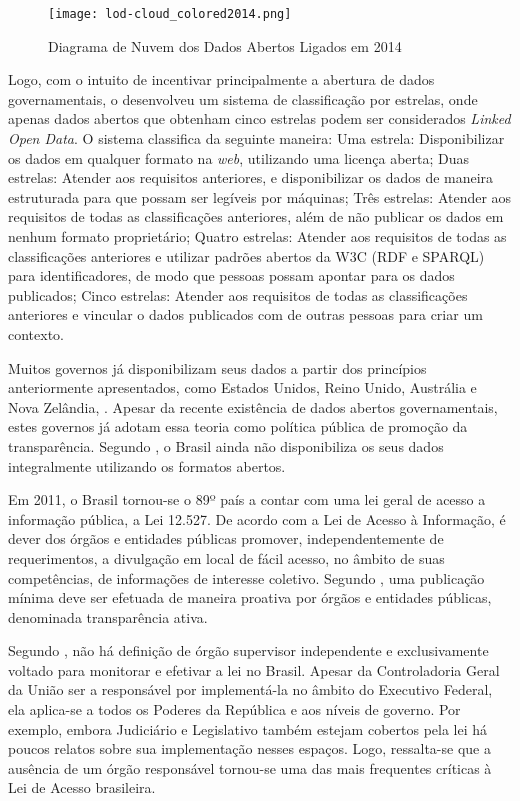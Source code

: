 \documentclass[
	12pt,				%
	openright,			%
	twoside,			%
	a4paper,			%
	english,			%
	french,				%
	spanish,			%
	brazil				%
	]{abntex2}
\begin{document}
\begin{figure}[htb]
	\caption{\label{grafo_lod}Diagrama de Nuvem dos Dados Abertos Ligados em 2014}
	\begin{center}
	    \texttt{[image: lod-cloud\_colored2014.png]}
	\end{center}
\end{figure}

Logo, com o intuito de incentivar principalmente a abertura de dados governamentais, o  
desenvolveu um sistema de classificação por estrelas, onde apenas dados abertos que obtenham cinco estrelas podem ser 
considerados \emph{Linked Open Data}. O sistema classifica da seguinte maneira:
Uma estrela: Disponibilizar os dados em qualquer formato na \emph{web}, utilizando uma licença aberta;
Duas estrelas: Atender aos requisitos anteriores, e disponibilizar os dados de maneira estruturada para que possam ser legíveis 
por máquinas;
Três estrelas: Atender aos requisitos de todas as classificações anteriores, além de não publicar os dados em nenhum formato 
proprietário;
Quatro estrelas: Atender aos requisitos de todas as classificações anteriores e utilizar padrões abertos da W3C (RDF e SPARQL)
para identificadores, de modo que pessoas possam apontar para os dados publicados;
Cinco estrelas: Atender aos requisitos de todas as classificações anteriores e vincular o dados publicados com de outras 
pessoas para criar um contexto.

Muitos governos já disponibilizam seus dados a partir dos princípios anteriormente apresentados, como Estados Unidos,
Reino Unido, Austrália e Nova Zelândia, \cite{agunegreg}. Apesar da recente existência de dados abertos governamentais,
estes governos já adotam essa teoria como política pública de promoção da transparência. Segundo , o Brasil ainda não disponibiliza os
seus dados integralmente utilizando os formatos abertos.

Em 2011, o Brasil tornou-se o 89º país a contar com uma lei geral de acesso a informação pública, a Lei 12.527. De acordo com 
a Lei de Acesso à Informação, é dever dos órgãos e entidades públicas promover, independentemente de requerimentos, a divulgação
em local de fácil acesso, no âmbito de suas competências, de informações de interesse coletivo. Segundo , uma publicação mínima deve ser
efetuada de maneira proativa por órgãos e entidades públicas, denominada transparência ativa.

Segundo , não há definição de órgão supervisor independente e exclusivamente voltado para monitorar
e efetivar a lei no Brasil. Apesar da Controladoria Geral da União ser a responsável por implementá-la no âmbito do Executivo
Federal, ela aplica-se a todos os Poderes da República e aos níveis de governo. Por exemplo, embora Judiciário e Legislativo
também estejam cobertos pela lei há poucos relatos sobre sua implementação nesses espaços. Logo, ressalta-se que a ausência de
um órgão responsável tornou-se uma das mais frequentes críticas à Lei de Acesso brasileira.
\end{document}
